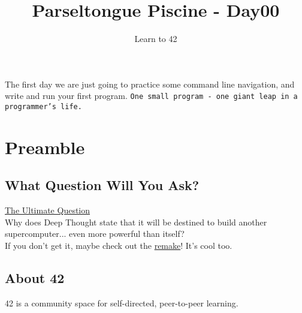 \documentclass{42-en}
\begin{document}
\title{Parseltongue Piscine - Day00}
\subtitle{Learn to 42}


\summary
{
The first day we are just going to practice some command line navigation, and write and run your first program. \texttt{One small program - one giant leap in a programmer's life.}
}

\maketitle

\tableofcontents



\chapter{Preamble}

\section{What Question Will You Ask?}
\href{https://www.youtube.com/watch?v=x2rS-ha8DbE}{The Ultimate Question}\\

Why does Deep Thought state that it will be destined to build another supercomputer... even more powerful than itself?\\

If you don't get it, maybe check out the \href{https://www.youtube.com/watch?v=aboZctrHfK8}{remake}! It's cool too.

\newpage

\section{About 42}

42 is a community space for self-directed, peer-to-peer learning.
\end{document}
